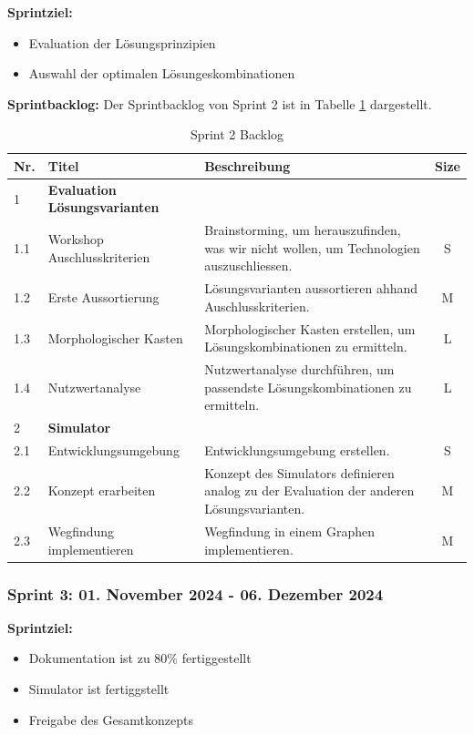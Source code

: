 \textbf{Sprintziel:}
\begin{itemize}
    \item Evaluation der Lösungsprinzipien
    \item Auswahl der optimalen Lösungeskombinationen
\end{itemize}

\textbf{Sprintbacklog:} Der Sprintbacklog von Sprint 2 ist in Tabelle \ref{table:sprint2-backlog} dargestellt.


\begin{table}[H]
\centering
\small
\begin{tabularx}{\textwidth}{|l|l|X|c|}
\hline
  \textbf{Nr.} & \textbf{Titel} & \textbf{Beschreibung} & \textbf{Size}\\
  \hline
  1  & \textbf{Evaluation Lösungsvarianten} &&\\
  \hline
  1.1  & Workshop Auschlusskriterien & Brainstorming, um herauszufinden, was wir nicht wollen, um Technologien auszuschliessen. & S\\
  \hline
  1.2 & Erste Aussortierung & Lösungsvarianten aussortieren ahhand Auschlusskriterien. & M\\
  \hline
  1.3 & Morphologischer Kasten & Morphologischer Kasten erstellen, um Lösungskombinationen zu ermitteln. & L\\
  \hline
  1.4 & Nutzwertanalyse & Nutzwertanalyse durchführen, um passendste Lösungskombinationen zu ermitteln. & L\\
  \hline
  2 & \textbf{Simulator} && \\
  \hline
  2.1 & Entwicklungsumgebung & Entwicklungsumgebung erstellen. & S \\
  \hline
  2.2 & Konzept erarbeiten & Konzept des Simulators definieren analog zu der Evaluation der anderen Lösungsvarianten. & M \\
  \hline
  2.3 & Wegfindung implementieren & Wegfindung in einem Graphen implementieren. & M \\
  \hline

\end{tabularx}
\caption{Sprint 2 Backlog}
\label{table:sprint2-backlog}
\end{table}

\newpage
\subsubsection{Sprint 3: 01. November 2024 - 06. Dezember 2024}

\textbf{Sprintziel:}
\begin{itemize}
    \item Dokumentation ist zu 80\% fertiggestellt
    \item Simulator ist fertiggstellt
    \item Freigabe des Gesamtkonzepts
\end{itemize}

